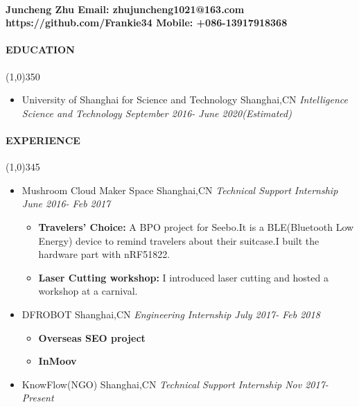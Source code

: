 \documentclass{article}
\begin{document}
\paragraph{{\huge Juncheng Zhu}
\hfill
Email: zhujuncheng1021@163.com
\newline
https://github.com/Frankie34
\hfill
Mobile: +086-13917918368}

\paragraph{EDUCATION}
\line(1,0){350}


\begin{itemize}

\item{University of Shanghai for Science and Technology}
\hfill
Shanghai,CN
\newline
\textit{Intelligence Science and Technology
\hfill
September 2016- June 2020(Estimated)}
\end{itemize}

\paragraph{EXPERIENCE}
\line(1,0){345}
\begin{itemize}
\item{Mushroom Cloud Maker Space
\hfill
Shanghai,CN
}
\newline
\textit{Technical Support Internship
\hfill
June 2016- Feb 2017
}
\begin{itemize}

\item{\textbf{Travelers' Choice:} A BPO project for Seebo.It is a BLE(Bluetooth Low Energy) device to remind travelers about their suitcase.I built the hardware part with nRF51822.}

\item{\textbf{Laser Cutting workshop:}
    I introduced laser cutting and hosted a workshop at a carnival.
}

\end{itemize}
\item{DFROBOT
\hfill
Shanghai,CN
\newline
\textit{Engineering Internship
\hfill
July 2017- Feb 2018
}
\begin{itemize}

\item{\textbf{Overseas SEO project} 
}
\end{itemize}
\begin{itemize}

\item{\textbf{InMoov} 
}
\end{itemize}
}
\item{KnowFlow(NGO)
\hfill
Shanghai,CN
}
\newline
\textit{Technical Support Internship
\hfill
Nov 2017- Present
}

\end{itemize}
\end{document}

